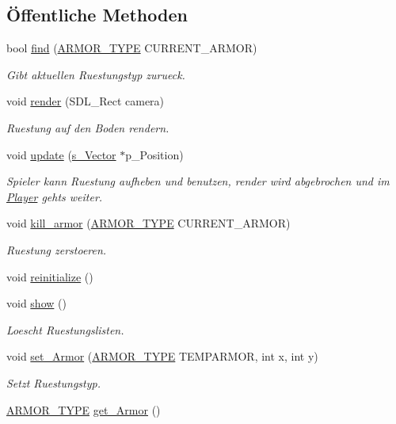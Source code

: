 \subsection*{Öffentliche Methoden}
\begin{DoxyCompactItemize}
\item 
bool \hyperlink{class_armor_manager_ac5fa1487799e07ac40cdc4f44282c65e}{find} (\hyperlink{globals_8h_a8e5f74edbc14259a161d93bd9a69d236}{A\-R\-M\-O\-R\-\_\-\-T\-Y\-P\-E} C\-U\-R\-R\-E\-N\-T\-\_\-\-A\-R\-M\-O\-R)
\begin{DoxyCompactList}\small\item\em Gibt aktuellen Ruestungstyp zurueck. \end{DoxyCompactList}\item 
void \hyperlink{class_armor_manager_a79a20356f9630c6c51a816f0163b28bf}{render} (S\-D\-L\-\_\-\-Rect camera)
\begin{DoxyCompactList}\small\item\em Ruestung auf den Boden rendern. \end{DoxyCompactList}\item 
void \hyperlink{class_armor_manager_a6f608963c4a1efb31b2d658ee5246459}{update} (\hyperlink{structs___vector}{s\-\_\-\-Vector} $\ast$p\-\_\-\-Position)
\begin{DoxyCompactList}\small\item\em Spieler kann Ruestung aufheben und benutzen, render wird abgebrochen und im \hyperlink{class_player}{Player} gehts weiter. \end{DoxyCompactList}\item 
void \hyperlink{class_armor_manager_a4ce4fd2a1570a917b844c740d3164325}{kill\-\_\-armor} (\hyperlink{globals_8h_a8e5f74edbc14259a161d93bd9a69d236}{A\-R\-M\-O\-R\-\_\-\-T\-Y\-P\-E} C\-U\-R\-R\-E\-N\-T\-\_\-\-A\-R\-M\-O\-R)
\begin{DoxyCompactList}\small\item\em Ruestung zerstoeren. \end{DoxyCompactList}\item 
void \hyperlink{class_armor_manager_a9ee86635d7c7087cc59cb76cbc954d80}{reinitialize} ()
\item 
void \hyperlink{class_armor_manager_a67c0b4d0206bb0916dc2c6f8ca0ee225}{show} ()
\begin{DoxyCompactList}\small\item\em Loescht Ruestungslisten. \end{DoxyCompactList}\item 
void \hyperlink{class_armor_manager_ae1d12bdafa1ec883841aa311307a3b85}{set\-\_\-\-Armor} (\hyperlink{globals_8h_a8e5f74edbc14259a161d93bd9a69d236}{A\-R\-M\-O\-R\-\_\-\-T\-Y\-P\-E} T\-E\-M\-P\-A\-R\-M\-O\-R, int x, int y)
\begin{DoxyCompactList}\small\item\em Setzt Ruestungstyp. \end{DoxyCompactList}\item 
\hyperlink{globals_8h_a8e5f74edbc14259a161d93bd9a69d236}{A\-R\-M\-O\-R\-\_\-\-T\-Y\-P\-E} \hyperlink{class_armor_manager_a08b4b1f42b418b09b6917767a3baae74}{get\-\_\-\-Armor} ()
\end{DoxyCompactItemize}
